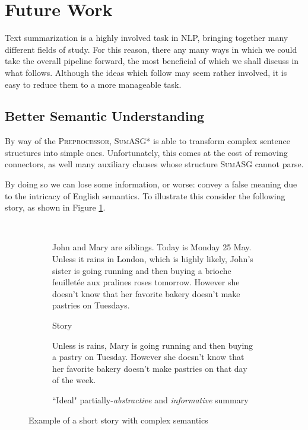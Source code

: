 \section{Future Work}

Text summarization is a highly involved task in NLP, bringing together many different fields of study. For this reason, there any many ways in which we could take the overall pipeline forward, the most beneficial of which we shall discuss in what follows. Although the ideas which follow may seem rather involved, it is easy to reduce them to a more manageable task.

\subsection{Better Semantic Understanding}

By way of the \textsc{Preprocessor}, \textsc{SumASG*} is able to transform complex sentence structures into simple ones. Unfortunately, this comes at the cost of removing connectors, as well many auxiliary clauses whose structure \textsc{SumASG} cannot parse.

By doing so we can lose some information, or worse: convey a false meaning due to the intricacy of English semantics. To illustrate this consider the following story, as shown in Figure \ref{fig:complex_summary}.

\begin{figure}[H]\
\begin{subfigure}{\textwidth}
\begin{displayquote}
John and Mary are siblings. Today is Monday 25 May. Unless it rains in London, which is highly likely, John's sister is going running and then buying a brioche feuilletée aux pralines roses tomorrow. However she doesn't know that her favorite bakery doesn't make pastries on Tuesdays.
\end{displayquote}
\caption{Story}
\vspace{\baselineskip}
\end{subfigure}
\begin{subfigure}{\textwidth}
\begin{displayquote}
Unless is rains, Mary is going running and then buying a pastry on Tuesday. However she doesn't know that her favorite bakery doesn't make pastries on that day of the week.
\caption{``Ideal" partially-\textit{abstractive} and \textit{informative} summary}
\end{displayquote}
\end{subfigure}
\caption{Example of a short story with complex semantics}
\label{fig:complex_summary}
\end{figure}


